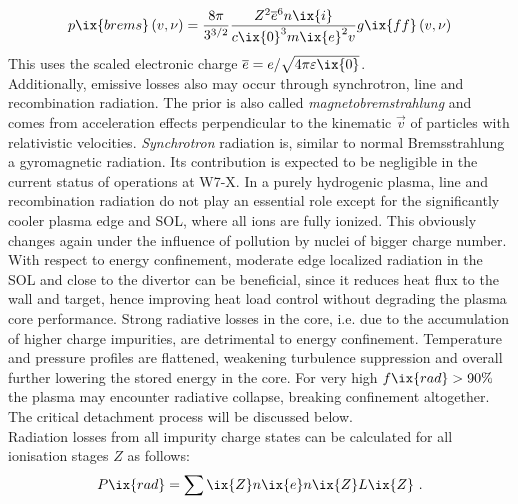 %
            \begin{align}%
                p\ix{brems}\left(v,\nu\right)=\frac{8\pi}{3^{3/2}}\frac{Z^{2}\overline{e}^{6}n\ix{i}}{c\ix{0}^{3}m\ix{e}^{2}v}g\ix{ff}\left(v,\nu\right)\label{eq:bremsquant}%
            \end{align}%
%
            This uses the scaled electronic charge $\overline{e}=e/\sqrt{4\pi\varepsilon\ix{0}}$.\cite{WikiBremsstrahl}\\%
            Additionally, emissive losses also may occur through synchrotron, line and recombination radiation. The prior is also called \textit{magnetobremstrahlung} and comes from acceleration effects perpendicular to the kinematic $\vec{v}$ of particles with relativistic velocities. \textit{Synchrotron} radiation is, similar to normal Bremsstrahlung a gyromagnetic radiation. Its contribution is expected to be negligible in the current status of operations at W7-X. In a purely hydrogenic plasma, line and recombination radiation do not play an essential role except for the significantly cooler plasma edge and SOL, where all ions are fully ionized. This obviously changes again under the influence of pollution by nuclei of bigger charge number\cite{WikiSynchrotron}.\\%
            With respect to energy confinement, moderate edge localized radiation in the SOL and close to the divertor can be beneficial, since it reduces heat flux to the wall and target, hence improving heat load control without degrading the plasma core performance. Strong radiative losses in the core, i.e. due to the accumulation of higher charge impurities, are detrimental to energy confinement. Temperature and pressure profiles are flattened, weakening turbulence suppression and overall further lowering the stored energy in the core. For very high $f\ix{rad}>90\%$ the plasma may encounter radiative collapse, breaking confinement altogether. The critical detachment process will be discussed below.\\%
            Radiation losses from all impurity charge states can be calculated for all ionisation stages $Z$ as follows:
%
            \begin{align}%
                P\ix{rad}=\sum\ix{Z}n\ix{e}n\ix{Z}L\ix{Z}\,\,.\nonumber%
            \end{align}%
%

